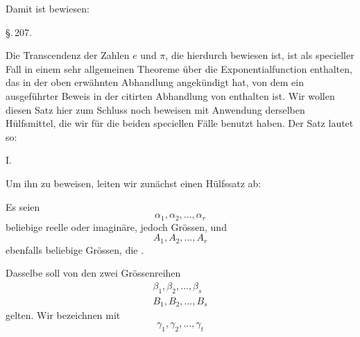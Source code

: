 
Damit ist bewiesen:


\begin{center}
\S.\,207.

\end{center}

Die Transcendenz der Zahlen $e$ und $\pi$, die hierdurch bewiesen ist, ist als specieller Fall in einem sehr allgemeinen Theoreme über die Exponentialfunction enthalten, das  in der oben erwähnten Abhandlung angekündigt hat, von dem ein ausgeführter Beweis in der citirten Abhandlung von  enthalten ist. Wir wollen diesen Satz hier zum Schluss noch beweisen mit Anwendung derselben Hülfsmittel, die wir für die beiden speciellen Fälle benutzt haben. Der Satz lautet so:

I.   

Um ihn zu beweisen, leiten wir zunächst einen Hülfssatz ab:

Es seien
\[
\alpha_1,\alpha_2,\ldots,\alpha_r
\]
beliebige reelle oder imaginäre, jedoch  Grössen, und
\[
A_1,A_2,\ldots,A_r
\]
ebenfalls beliebige Grössen, die .

Dasselbe soll von den zwei Grössenreihen
\[
\begin{gathered}
\beta_1,\beta_2,\ldots,\beta_s \\
B_1,B_2,\ldots,B_s
\end{gathered}
\]
gelten. Wir bezeichnen mit
\[
\gamma_1,\gamma_2,\ldots,\gamma_t
\]
